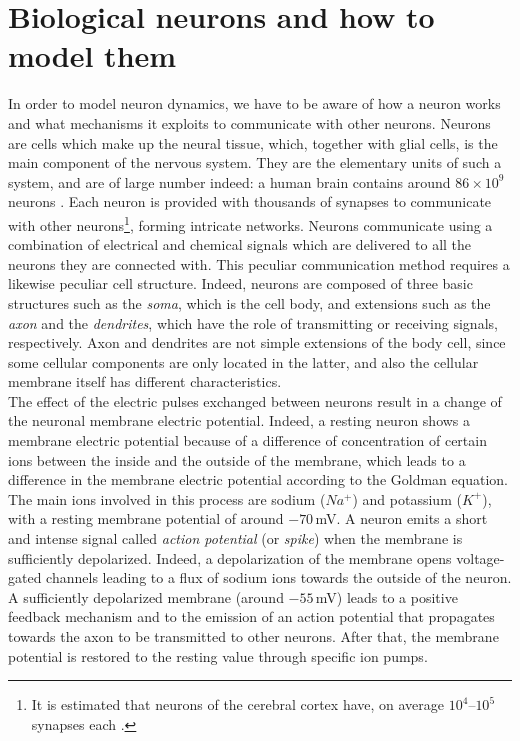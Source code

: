 \documentclass[a4paper, 12pt, twoside, openright]{book}
\begin{document}
\section{Biological neurons and how to model them}
In order to model neuron dynamics, we have to be aware of how a neuron works and what mechanisms it exploits to communicate with other neurons.
Neurons are cells which make up the neural tissue, which, together with glial cells, is the main component of the nervous system. They are the elementary units of such a system, and are of large number indeed: a human brain contains around $86\times 10^{9}$ neurons \cite{Azevedo2009}. Each neuron is provided with thousands of synapses to communicate with other neurons\footnote{It is estimated that neurons of the cerebral cortex have, on average $10^{4}$--$10^5$ synapses each \cite{Cragg1975, Alonso-Nanclares2008}.}, forming intricate networks. Neurons communicate using a combination of electrical and chemical signals which are delivered to all the neurons they are connected with. This peculiar communication method requires a likewise peculiar cell structure. Indeed, neurons are composed of three basic structures such as the \textit{soma}, which is the cell body, and extensions such as the \textit{axon} and the \textit{dendrites}, which have the role of transmitting or receiving signals, respectively. Axon and dendrites are not simple extensions of the body cell, since some cellular components are only located in the latter, and also the cellular membrane itself has different characteristics.\\
The effect of the electric pulses exchanged between neurons result in a change of the neuronal membrane electric potential.
Indeed, a resting neuron shows a membrane electric potential because of a difference of concentration of certain ions between the inside and the outside of the membrane, which leads to a difference in the membrane electric potential according to the Goldman equation. The main ions involved in this process are sodium ($Na^+$) and potassium ($K^+$), with a resting membrane potential of around $-70$\,mV. A neuron emits a short and intense signal called \textit{action potential} (or \textit{spike}) when the membrane is sufficiently depolarized. Indeed, a depolarization of the membrane opens voltage-gated channels leading to a flux of sodium ions towards the outside of the neuron. A sufficiently depolarized membrane (around $-55$\,mV) leads to a positive feedback mechanism and to the emission of an action potential that propagates towards the axon to be transmitted to other neurons. After that, the membrane potential is restored to the resting value through specific ion pumps.\\
\end{document}

